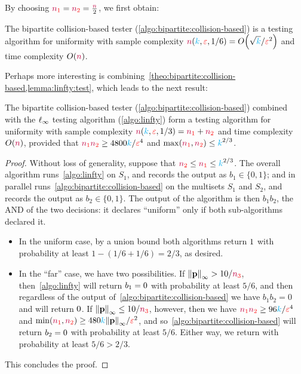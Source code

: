 \noindent By choosing $\nss=\nst=\frac{\ns}{2}$, we first obtain:
\begin{corollary}
  \label{theo:bipartite:collision-based:notradeoff}
The bipartite collision-based tester (\cref{algo:bipartite:collision-based}) is a testing algorithm for uniformity with sample complexity $\ns(\ab,\dst,1/6) = \bigO{\sqrt{\ab}/\dst^2}$ and time complexity $O(\ns)$.
\end{corollary}
Perhaps more interesting is combining~\cref{theo:bipartite:collision-based,lemma:linfty:test}, which leads to the next result:
\begin{corollary}
  \label{theo:bipartite:collision-based}
The bipartite collision-based tester (\cref{algo:bipartite:collision-based}) combined with the $\lp[\infty]$ testing algorithm (\cref{algo:linfty}) form a testing algorithm for uniformity with sample complexity $\ns(\ab,\dst,1/3) = \nss+\nst$ and time complexity $O(\ns)$, provided that $\nss\nst \geq 4800\ab/\dst^4$ and $\max(\nss,\nst)\leq \ab^{2/3}$.
\end{corollary}
\begin{proof}
Without loss of generality, suppose that $\nst\leq\nss\leq \ab^{2/3}$. The overall algorithm runs~\cref{algo:linfty} on $S_1$, and records the output as $b_1\in\{0,1\}$; and in parallel runs~\cref{algo:bipartite:collision-based} on the multisets $S_1$ and $S_2$, and records the output as $b_2\in\{0,1\}$. The output of the algorithm is then $b_1b_2$, \ie the \textsf{AND} of the two decisions: it declares ``uniform'' only if both sub-algorithms declared it.
\begin{itemize}
    \item In the uniform case, by a union bound both algorithms return $\accept$ with probability at least $1-(1/6+1/6)=2/3$, as desired.
    \item In the ``far'' case, we have two possibilities. If $\norminf{\p} > 10/\nsu$, then~\cref{algo:linfty} will return $b_1=\reject$ with probability at least $5/6$, and then regardless of the output of~\cref{algo:bipartite:collision-based} we have $b_1b_2=0$ and will return $\reject$. If $\norminf{\p} \leq 10/\nsu$, however, then we have $\nss\nst \geq 96\ab/\dst^4$ and $\min(\nss,\nst)\geq 480\ab\norminf{\p}/\dst^2$, and so~\cref{algo:bipartite:collision-based} will return $b_2=\reject$ with probability at least $5/6$. Either way, we return \reject with probability at least $5/6>2/3$.
\end{itemize}
This concludes the proof.
\end{proof}

